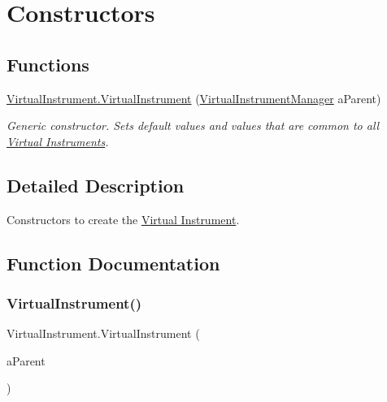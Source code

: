 \hypertarget{group___v_i_base_construct}{}\section{Constructors}
\label{group___v_i_base_construct}
\subsection*{Functions}
\begin{DoxyCompactItemize}
\item 
\hyperlink{group___v_i_base_construct_ga7b438b5f812fa0d3a6e91d74a3c261c9}{Virtual\+Instrument.\+Virtual\+Instrument} (\hyperlink{class_virtual_instrument_manager}{Virtual\+Instrument\+Manager} a\+Parent)
\begin{DoxyCompactList}\small\item\em Generic constructor. Sets default values and values that are common to all \hyperlink{group___v_i}{Virtual Instruments}. \end{DoxyCompactList}\end{DoxyCompactItemize}


\subsection{Detailed Description}
Constructors to create the \hyperlink{class_virtual_instrument}{Virtual Instrument}. 

\subsection{Function Documentation}
\mbox{\label{group___v_i_base_construct_ga7b438b5f812fa0d3a6e91d74a3c261c9}} 
\subsubsection{\texorpdfstring{Virtual\+Instrument()}{VirtualInstrument()}}
{\footnotesize\ttfamily Virtual\+Instrument.\+Virtual\+Instrument (\begin{DoxyParamCaption}\item[{\hyperlink{class_virtual_instrument_manager}{Virtual\+Instrument\+Manager}}]{a\+Parent }\end{DoxyParamCaption})}




